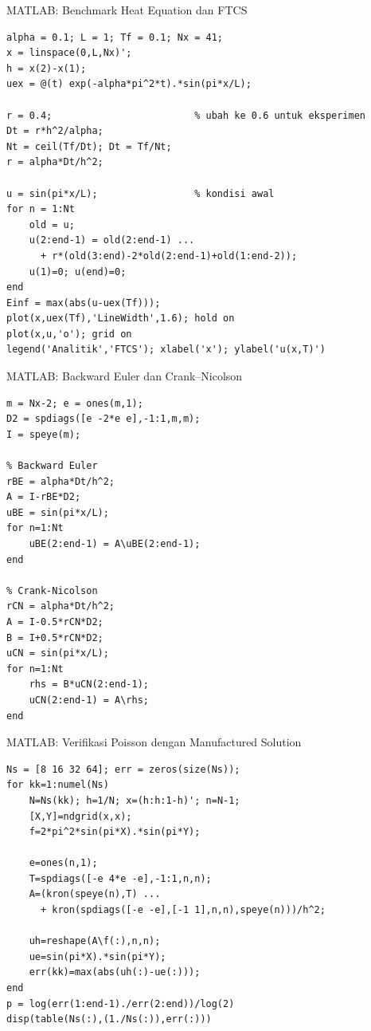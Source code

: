 \documentclass[aspectratio=169,10pt]{beamer}
\begin{document}
\begin{frame}[fragile]{MATLAB: Benchmark Heat Equation dan FTCS}
\scriptsize
\begin{lstlisting}[style=matlab]
alpha = 0.1; L = 1; Tf = 0.1; Nx = 41;
x = linspace(0,L,Nx)';
h = x(2)-x(1);
uex = @(t) exp(-alpha*pi^2*t).*sin(pi*x/L);

r = 0.4;                         % ubah ke 0.6 untuk eksperimen
Dt = r*h^2/alpha;
Nt = ceil(Tf/Dt); Dt = Tf/Nt;
r = alpha*Dt/h^2;

u = sin(pi*x/L);                 % kondisi awal
for n = 1:Nt
    old = u;
    u(2:end-1) = old(2:end-1) ...
      + r*(old(3:end)-2*old(2:end-1)+old(1:end-2));
    u(1)=0; u(end)=0;
end
Einf = max(abs(u-uex(Tf)));
plot(x,uex(Tf),'LineWidth',1.6); hold on
plot(x,u,'o'); grid on
legend('Analitik','FTCS'); xlabel('x'); ylabel('u(x,T)')
\end{lstlisting}
\end{frame}

\begin{frame}[fragile]{MATLAB: Backward Euler dan Crank--Nicolson}
\scriptsize
\begin{lstlisting}[style=matlab]
m = Nx-2; e = ones(m,1);
D2 = spdiags([e -2*e e],-1:1,m,m);
I = speye(m);

% Backward Euler
rBE = alpha*Dt/h^2;
A = I-rBE*D2;
uBE = sin(pi*x/L);
for n=1:Nt
    uBE(2:end-1) = A\uBE(2:end-1);
end

% Crank-Nicolson
rCN = alpha*Dt/h^2;
A = I-0.5*rCN*D2;
B = I+0.5*rCN*D2;
uCN = sin(pi*x/L);
for n=1:Nt
    rhs = B*uCN(2:end-1);
    uCN(2:end-1) = A\rhs;
end
\end{lstlisting}
\end{frame}

\begin{frame}[fragile]{MATLAB: Verifikasi Poisson dengan Manufactured Solution}
\scriptsize
\begin{lstlisting}[style=matlab]
Ns = [8 16 32 64]; err = zeros(size(Ns));
for kk=1:numel(Ns)
    N=Ns(kk); h=1/N; x=(h:h:1-h)'; n=N-1;
    [X,Y]=ndgrid(x,x);
    f=2*pi^2*sin(pi*X).*sin(pi*Y);

    e=ones(n,1);
    T=spdiags([-e 4*e -e],-1:1,n,n);
    A=(kron(speye(n),T) ...
      + kron(spdiags([-e -e],[-1 1],n,n),speye(n)))/h^2;

    uh=reshape(A\f(:),n,n);
    ue=sin(pi*X).*sin(pi*Y);
    err(kk)=max(abs(uh(:)-ue(:)));
end
p = log(err(1:end-1)./err(2:end))/log(2)
disp(table(Ns(:),(1./Ns(:)),err(:)))
\end{lstlisting}
\end{frame}
\end{document}
